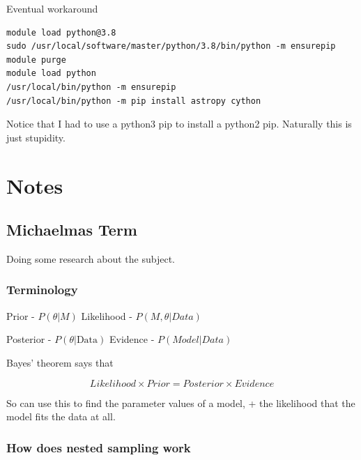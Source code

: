 \documentclass[11pt]{article}
\begin{document}
Eventual workaround
\begin{verbatim}
module load python@3.8
sudo /usr/local/software/master/python/3.8/bin/python -m ensurepip 
module purge
module load python
/usr/local/bin/python -m ensurepip 
/usr/local/bin/python -m pip install astropy cython 
\end{verbatim}
Notice that I had to use a python3 pip to install a python2
pip. Naturally this is just stupidity.

\section{Notes}
\label{sec:orga7b8a26}
\subsection{Michaelmas Term}
\label{sec:org1542546}

Doing some research about the subject. 


\subsubsection{Terminology}
\label{sec:org71d0fda}

Prior - \(P(\theta | M)\)
Likelihood - \(P(M, \theta | Data)\)

Posterior - \(P(\theta | \text{Data})\)
Evidence - \(P(Model | Data)\)

Bayes' theorem says that 

\[Likelihood \times Prior = Posterior \times Evidence\]

So can use this to find the parameter values of a model, + the
likelihood that the model fits the data at all.


\subsubsection{How does nested sampling work}
\label{sec:org5de9bb3}
\end{document}
